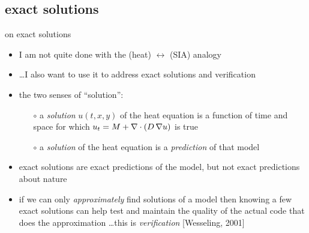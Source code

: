 \subsection{exact solutions}

\begin{frame}{on exact solutions}

\begin{itemize}
\item I am not quite done with the (heat) $\leftrightarrow$ (SIA) analogy
\item \dots I also want to use it to address exact solutions and verification

\bigskip
\item the two senses of ``solution'':
  \begin{itemize}
  \small
  \item[$\circ$] a \emph{solution} $u(t,x,y)$ of the heat equation is a function of time and space for which $u_t = M + \nabla\cdot (D\, \nabla u)$ is true
  \item[$\circ$] a \emph{solution} of the heat equation is a \emph{prediction} of that model
  \normalsize
  \end{itemize}
\item exact solutions are exact predictions of the model, but not exact predictions about nature
\item if we can only \emph{approximately} find solutions of a model then knowing a few exact solutions can help test and maintain the quality of the actual code that does the approximation \dots this is \emph{verification} [Wesseling, 2001]\nocite{Wesseling}
\end{itemize}
\end{frame}



